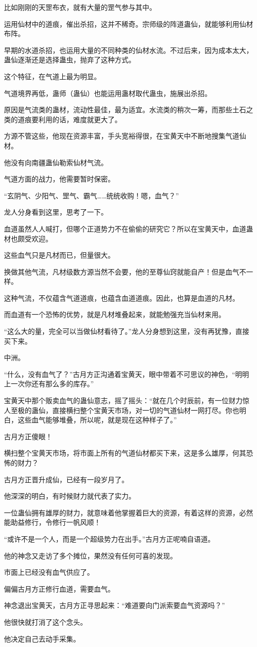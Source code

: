 \begin{this_body}
比如刚刚的天罡布衣，就有大量的罡气参与其中。

运用仙材中的道痕，催出杀招，这并不稀奇。宗师级的阵道蛊仙，就能够利用仙材布阵。

早期的水道杀招，也运用大量的不同种类的仙材水流。不过后来，因为成本太大，蛊仙逐渐还是选择蛊虫，抛弃了这种方式。

这个特征，在气道上最为明显。

气道境界再低，蛊师（蛊仙）也能运用蛊材取代蛊虫，施展出杀招。

原因是气流类的蛊材，流动性最佳，最为适宜。水流类的稍次一筹，而那些土石之类的道痕要利用的话，难度就更大了。

方源不管这些，他现在资源丰富，手头宽裕得很，在宝黄天中不断地搜集气道仙材。

他没有向南疆蛊仙勒索仙材气流。

气道方面的战力，他需要暂时保密。

“玄阴气、少阳气、罡气、霸气……统统收购！嗯，血气？”

龙人分身看到这里，思考了一下。

血道虽然人人喊打，但哪个正道势力不在偷偷的研究它？所以在宝黄天中，血道蛊材也颇受欢迎。

这些血气只是凡材而已，但量很大。

换做其他气流，凡材级数方源当然不会要，他的至尊仙窍就能自产！但是血气不一样。

这种气流，不仅蕴含气道道痕，也蕴含血道道痕。因此，也算是血道的凡材。

而血道有一个恐怖的优势，就是凡材堆叠起来，就能勉强充当仙材来用。

“这么大的量，完全可以当做仙材看待了。”龙人分身想到这里，没有再犹豫，直接买下来。

中洲。

“什么，没有血气了？”古月方正沟通着宝黄天，眼中带着不可思议的神色，“明明上一次你还有那么多的库存。”

宝黄天中那个贩卖血气的蛊仙意志，摇了摇头：“就在几个时辰前，有一位财力惊人至极的蛊仙，直接横扫整个宝黄天市场，对一切的气道仙材一网打尽。你也明白，这些血气能够堆叠，所以呢，就是现在这种样子了。”

古月方正傻眼！

横扫整个宝黄天市场，将市面上所有的气道仙材都买下来，这是多么雄厚，何其恐怖的财力？

古月方正晋升成仙，已经有一段岁月了。

他深深的明白，有时候财力就代表了实力。

一位蛊仙拥有雄厚的财力，就意味着他掌握着巨大的资源，有着这样的资源，必然能助益修行，令修行一帆风顺！

“或许不是一个人，而是一个超级势力在出手。”古月方正呢喃自语道。

他的神念又走访了多个摊位，果然没有任何可喜的发现。

市面上已经没有血气供应了。

偏偏古月方正修行血道，需要血气。

神念退出宝黄天，古月方正寻思起来：“难道要向门派索要血气资源吗？”

他很快就打消了这个念头。

他决定自己去动手采集。

\end{this_body}

